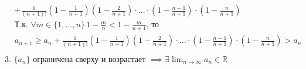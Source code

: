 {\begin{mcproof}
\begin{equation*}
\begin{split}
    & + \frac{1}{(n + 1)!} \left(1 - \frac{1}{n + 1}\right) \left(1 - \frac{2}{n + 1}\right) \cdot ... \cdot \left(1 - \frac{n - 1}{n + 1}\right) \cdot \left(1 - \frac{n}{n + 1}\right) \\
    & \text{Т.к. } \forall m \in \{ 1, ..., n \} \, 1 - \frac{m}{n} < 1 - \frac{m}{n + 1} \text{, то } \\
    & a_{n + 1} \ge a_{n} + \frac{1}{(n + 1)!} \left(1 - \frac{1}{n + 1}\right) \left(1 - \frac{2}{n + 1}\right) \cdot ... \cdot \left(1 - \frac{n - 1}{n + 1}\right) \cdot \left(1 - \frac{n}{n + 1}\right) 
        > a_n \\
\end{split}
\end{equation*}
    3. $ \{ a_n \} $ ограничена сверху и возрастает $ \implies \exists \lim_{n\to\infty} a_n \in \mathbb{R} $
\end{mcproof}
}

